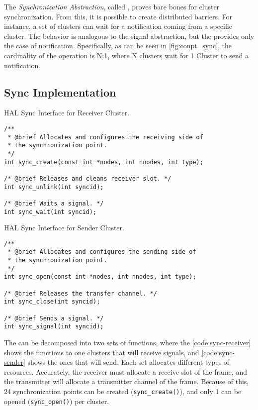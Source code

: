 
			The \textit{Synchronization Abstraction}, called \sync, proves bare bones
			for cluster synchronization.
			From this, it is possible to create distributed barriers.
			For instance, a set of clusters can wait for a notification coming
			from a specific cluster.
			The behavior is analogous to the \posix signal abstraction, but the \sync
			provides only the case of notification.
			Specifically, as can be seen in \autoref{fig:conpt_sync}, the
			cardinality of the operation is N:1, where N clusters wait for 1 Cluster
			to send a notification.

			\subsection*{Sync Implementation}

\begin{listing}[!tb]
\caption{HAL Sync Interface for Receiver Cluster.}
\label{code:sync-receiver}
\begin{verbatim}
/**
 * @brief Allocates and configures the receiving side of
 * the synchronization point.
 */
int sync_create(const int *nodes, int nnodes, int type);

/* @brief Releases and cleans receiver slot. */
int sync_unlink(int syncid);

/* @brief Waits a signal. */
int sync_wait(int syncid);
\end{verbatim}
\end{listing}

\begin{listing}[!tb]
\caption{HAL Sync Interface for Sender Cluster.}
\label{code:sync-sender}
\begin{verbatim}
/**
 * @brief Allocates and configures the sending side of
 * the synchronization point.
 */
int sync_open(const int *nodes, int nnodes, int type);

/* @brief Releases the transfer channel. */
int sync_close(int syncid);

/* @brief Sends a signal. */
int sync_signal(int syncid);
\end{verbatim}
\end{listing}

				The \sync can be decomposed into two sets of functions, where the
				\autoref{code:sync-receiver} shows the functions to one clusters
				that will receive signals, and \autoref{code:sync-sender} shows the
				ones that will send.
				Each set allocates different types of resources.
				Accurately, the receiver must allocate a receive slot of the frame,
				and the transmitter will allocate a transmitter channel of the frame.
				Because of this, 24 synchronization points can be created (\texttt{sync\_create()}),
				and only 1 can be opened (\texttt{sync\_open()}) per cluster.

